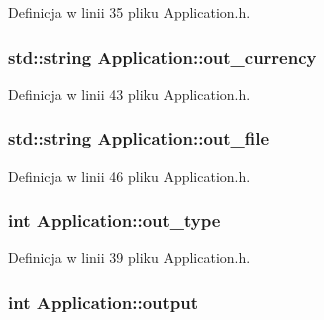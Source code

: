 \-Definicja w linii 35 pliku \-Application.\-h.

\hypertarget{class_application_a163202d7dc3c0863883af922d88f6b08}{
\subsubsection[{out\-\_\-currency}]{\setlength{\rightskip}{0pt plus 5cm}std\-::string {\bf \-Application\-::out\-\_\-currency}}}\label{class_application_a163202d7dc3c0863883af922d88f6b08}


\-Definicja w linii 43 pliku \-Application.\-h.

\hypertarget{class_application_af3e196e2f013c693c29c3ac89a7631d1}{
\subsubsection[{out\-\_\-file}]{\setlength{\rightskip}{0pt plus 5cm}std\-::string {\bf \-Application\-::out\-\_\-file}}}\label{class_application_af3e196e2f013c693c29c3ac89a7631d1}


\-Definicja w linii 46 pliku \-Application.\-h.

\hypertarget{class_application_ae3526813bef766d79da0af787c48af3a}{
\subsubsection[{out\-\_\-type}]{\setlength{\rightskip}{0pt plus 5cm}int {\bf \-Application\-::out\-\_\-type}}}\label{class_application_ae3526813bef766d79da0af787c48af3a}


\-Definicja w linii 39 pliku \-Application.\-h.

\hypertarget{class_application_a3aaf22cf1c0799a24fb381b5d2a7bb52}{
\subsubsection[{output}]{\setlength{\rightskip}{0pt plus 5cm}int {\bf \-Application\-::output}}}\label{class_application_a3aaf22cf1c0799a24fb381b5d2a7bb52}


